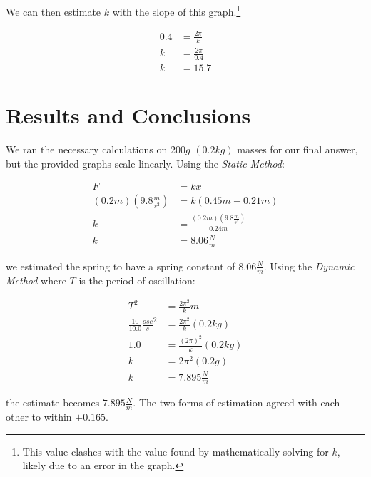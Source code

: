 \documentclass{article}
\begin{document}
 \datatable

\begin{center}
\end{center}

We can then estimate $k$ with the slope of this graph.\footnote{This value clashes with the value found by mathematically solving for $k$, likely due to an error in the graph.}

\begin{center}
\begin{align*}
0.4 &= \frac{2\pi}{k} \\
k &= \frac{2\pi}{0.4} \\
k &= 15.7
\end{align*}
\end{center}

\section{Results and Conclusions}

We ran the necessary calculations on $200g$ $(0.2kg)$ masses for our final answer, but the provided graphs scale linearly. Using the \emph{Static Method}:

\begin{align*}
F &= kx \\
(0.2m)(9.8\frac{m}{s^2}) &= k(0.45m-0.21m) \\
k &= \frac{(0.2m)(9.8\frac{m}{s^2})}{0.24m} \\
k &= 8.06\frac{N}{m}
\end{align*}

we estimated the spring to have a spring constant of $8.06\frac{N}{m}$.
Using the \emph{Dynamic Method} where $T$ is the period of oscillation:

\begin{align*}
T^{2} &= \frac{2\pi^{2}}{k}m \\
\frac{10}{10.0}\frac{osc}{s}^2 &= \frac{2\pi^{2}}{k}(0.2kg) \\
1.0 &= \frac{(2\pi)^{2}}{k}(0.2kg) \\
k &= 2\pi^2(0.2g) \\
k &= 7.895\frac{N}{m}
\end{align*}

the estimate becomes $7.895\frac{N}{m}$. The two forms of estimation agreed with each other to within $\pm{0.165}$.
\end{document}

